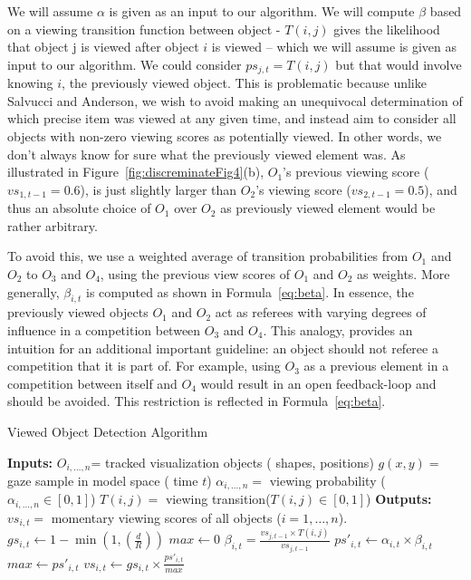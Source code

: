 We will assume $\alpha$ is given as an input to our algorithm. We will compute $\beta$ based on a viewing transition function between object - $T(i,j)$ gives the likelihood that object j is viewed after object $i$ is viewed – which we will assume is given as input to our algorithm. We could consider $ps_{j,t} = T(i,j)$ but that would involve knowing $i$, the previously viewed object. This is problematic because unlike Salvucci and Anderson, we wish to avoid making an unequivocal determination of which precise item was viewed at any given time, and instead aim to consider all objects with non-zero viewing scores as potentially viewed. In other words, we don't always know for sure what the previously viewed element was. As illustrated in Figure~\ref{fig:discreminateFig4}(b), $O_1$'s previous viewing score ($vs_{1,t-1}=0.6$), is just slightly larger than $O_2$'s viewing score ($vs_{2,t-1}=0.5$), and thus an absolute choice of $O_1$ over $O_2$ as previously viewed element would be rather arbitrary. 

To avoid this, we use a weighted average of transition probabilities from $O_1$ and $O_2$ to $O_3$ and $O_4$, using the previous view scores of $O_1$ and $O_2$ as weights.  More generally, $\beta_{i,t}$ is computed as shown in Formula~\ref{eq:beta}. In essence, the previously viewed objects $O_1$ and $O_2$ act as referees with varying degrees of influence in a competition between $O_3$ and $O_4$. This analogy, provides an intuition for an additional important guideline: an object should not referee a competition that it is part of. For example, using $O_3$ as a previous element in a competition between itself and $O_4$ would result in an open feedback-loop and should be avoided. This restriction is reflected in Formula~\ref{eq:beta}. 

\begin{algorithm}
\caption{Viewed Object Detection Algorithm}
\label{alg:ObjectDetection}
\begin{algorithmic}[1]
\State \textbf{Inputs: } 
\Statex $O_{i, \ldots, n}$= tracked visualization objects ( shapes, positions)
\Statex $g(x,y) = $ gaze sample in model space ( time $t$)
\Statex $\alpha_{i, \ldots, n} = $ viewing probability ($\alpha_{i, \ldots, n} \in [0,1]$)
\Statex $T(i,j) = $ viewing transition($T(i,j) \in [0,1]$)
\State \textbf{Outputs:}
\Statex $vs_{i,t} = $ momentary viewing scores of all objects ($i = 1, \ldots, n$). 
	\State $gs_{i,t} \gets 1 - \min (1, (\frac{d}{R}))$	
\EndFor
\State $max \gets 0$
		\State $\beta_{i,t} = \frac{vs_{j,t-1} \times T(i,j)}{vs_{j,t-1}}$
		\State $ps'_{i,t} \gets \alpha_{i,t} \times \beta_{i,t}$
			\State $max \gets ps'_{i,t}$
		\EndIf
	\EndIf
\EndFor
{}
	\State $vs_{i,t} \gets gs_{i,t} \times \frac{ps'_{i,t}}{max} $
\EndFor
\end{algorithmic}
\end{algorithm}

